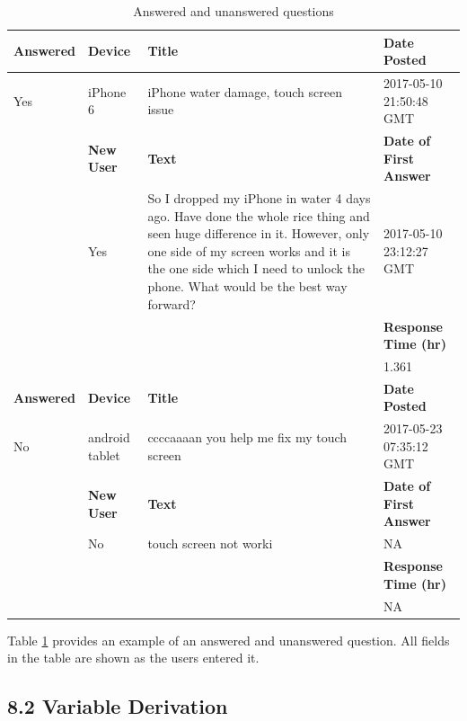 \documentclass{article}
\begin{document}
\begin{table}[!htbp]
\centering
\begin{tabular}{| l | l | p{6cm} | l |}
  \hline
 \textbf{Answered} & \textbf{Device} & \textbf{Title} & \textbf{Date Posted} \\
  \hline
  Yes & iPhone 6 & iPhone water damage, touch screen issue &  2017-05-10 21:50:48 GMT \\ \cline{2 - 4}
  & \textbf{New User} & \textbf{Text} & \textbf{Date of First Answer} \\ \cline{2 - 4}
  & Yes & So I dropped my iPhone in water 4 days ago. Have done the whole rice thing and seen huge difference in it. However, only one side of my screen works and it is the one side which I need to unlock the phone. What would be the best way forward? & 2017-05-10 23:12:27 GMT \\ \cline{4 - 4}
  & & & \textbf{Response Time (hr)} \\ \cline{4 - 4}
  & & & 1.361 \\ \cline{4-4} \hline
  \textbf{Answered} & \textbf{Device} & \textbf{Title} & \textbf{Date Posted} \\ \cline{1 - 4}
  No & android tablet & ccccaaaan you help me fix my touch screen & 2017-05-23 07:35:12 GMT \\ \cline{2 - 4}
  & \textbf{New User} & \textbf{Text} & \textbf{Date of First Answer} \\ \cline{2 - 4}
  & No & touch screen not worki & NA \\ \cline{4 - 4}
  & & & \textbf{Response Time (hr)} \\ \cline{4 - 4}
  & & & NA \\ 
   \hline
\end{tabular}
\caption{Answered and unanswered questions}
\label{table:questions}
\end{table}

Table \ref{table:questions} provides an example of an answered and unanswered question. All fields in the table are shown as the users entered it. 


\subsection*{8.2 Variable Derivation}
\end{document}
